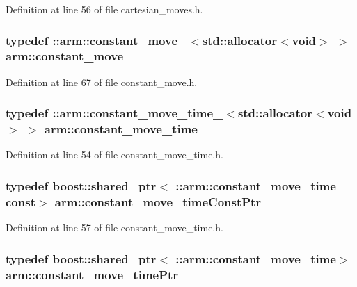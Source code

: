 \-Definition at line 56 of file cartesian\-\_\-moves.\-h.

\subsubsection[{constant\-\_\-move}]{\setlength{\rightskip}{0pt plus 5cm}typedef \-::{\bf arm\-::constant\-\_\-move\-\_\-}$<$std\-::allocator$<$void$>$ $>$ {\bf arm\-::constant\-\_\-move}}\label{namespacearm_a7d159e58cd92a88eee887bc558afadca}


\-Definition at line 67 of file constant\-\_\-move.\-h.

\subsubsection[{constant\-\_\-move\-\_\-time}]{\setlength{\rightskip}{0pt plus 5cm}typedef \-::{\bf arm\-::constant\-\_\-move\-\_\-time\-\_\-}$<$std\-::allocator$<$void$>$ $>$ {\bf arm\-::constant\-\_\-move\-\_\-time}}\label{namespacearm_adb969592b65a10fbc8d91d21804fc208}


\-Definition at line 54 of file constant\-\_\-move\-\_\-time.\-h.

\subsubsection[{constant\-\_\-move\-\_\-time\-Const\-Ptr}]{\setlength{\rightskip}{0pt plus 5cm}typedef boost\-::shared\-\_\-ptr$<$ \-::{\bf arm\-::constant\-\_\-move\-\_\-time} const$>$ {\bf arm\-::constant\-\_\-move\-\_\-time\-Const\-Ptr}}\label{namespacearm_aedf2fd6b120e07fb1f11d8814d26e186}


\-Definition at line 57 of file constant\-\_\-move\-\_\-time.\-h.

\subsubsection[{constant\-\_\-move\-\_\-time\-Ptr}]{\setlength{\rightskip}{0pt plus 5cm}typedef boost\-::shared\-\_\-ptr$<$ \-::{\bf arm\-::constant\-\_\-move\-\_\-time}$>$ {\bf arm\-::constant\-\_\-move\-\_\-time\-Ptr}}\label{namespacearm_a04ba269f0f1dea91dc6822273aa0c29b}


